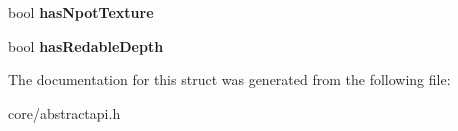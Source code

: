 \begin{DoxyCompactItemize}
\item 
\hypertarget{struct_tempest_1_1_abstract_a_p_i_1_1_caps_a93562601517403668483bdfd31d8f776}{bool {\bfseries has\+Npot\+Texture}}\label{struct_tempest_1_1_abstract_a_p_i_1_1_caps_a93562601517403668483bdfd31d8f776}

\item 
\hypertarget{struct_tempest_1_1_abstract_a_p_i_1_1_caps_a19677bf2615d729b46a67361efcb9486}{bool {\bfseries has\+Redable\+Depth}}\label{struct_tempest_1_1_abstract_a_p_i_1_1_caps_a19677bf2615d729b46a67361efcb9486}

\end{DoxyCompactItemize}


The documentation for this struct was generated from the following file\+:\begin{DoxyCompactItemize}
\item 
core/abstractapi.\+h\end{DoxyCompactItemize}
